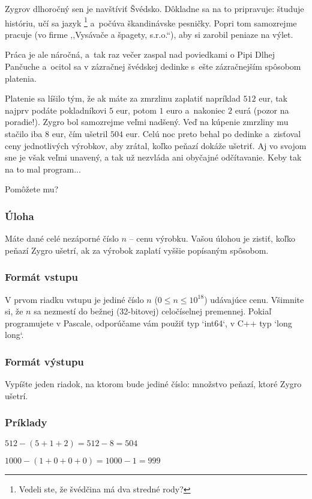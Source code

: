 Zygrov dlhoročný sen je navštíviť Švédsko. Dôkladne sa na to pripravuje: študuje históriu, učí sa jazyk%
\footnote{Vedeli ste, že švédčina má dva stredné rody?} a~počúva škandinávske pesničky.
Popri tom samozrejme pracuje (vo firme ,,Vysávače a špagety, s.r.o.``), aby si zarobil peniaze na výlet. 

Práca je ale náročná, a~tak raz večer zaspal nad poviedkami o Pipi Dlhej Pančuche
a~ocitol sa v zázračnej švédskej dedinke s~ešte zázračnejším spôsobom platenia.

Platenie sa líšilo tým, že ak máte za zmrzlinu zaplatiť napríklad $512$ eur, tak najprv podáte pokladníkovi $5$ eur,
potom $1$ euro a~nakoniec $2$ eurá (pozor na poradie!).
Zygro bol samozrejme veľmi nadšený. Veď na kúpenie zmrzliny mu stačilo iba $8$ eur, čím ušetril
$504$ eur. Celú noc preto behal po dedinke a~zisťoval ceny jednotlivých výrobkov, aby zrátal, koľko
peňazí dokáže ušetriť. Aj vo svojom sne je však veľmi unavený, a tak už nezvláda ani obyčajné
odčítavanie. Keby tak na to mal program...

Pomôžete mu?

\subsubsection{Úloha}

Máte dané celé nezáporné číslo $n$ -- cenu výrobku. Vašou úlohou je zistiť, koľko
peňazí Zygro ušetrí, ak za výrobok zaplatí vyššie popísaným spôsobom.

\subsubsection{Formát vstupu}

V prvom riadku vstupu je jediné číslo $n$ ($0 \leq n \leq 10^{18}$) udávajúce cenu. 
Všimnite si, že $n$ sa nezmestí do bežnej (32-bitovej) celočíselnej premennej.
Pokiaľ programujete v Pascale, odporúčame vám použiť typ `int64`, v C++ typ `long
long`.

\subsubsection{Formát výstupu}

Vypíšte jeden riadok, na ktorom bude jediné číslo: množstvo peňazí, ktoré Zygro
ušetrí.

\subsubsection{Príklady}


$512 - (5 + 1 + 2) = 512 - 8 = 504$


$1000 - (1 + 0 + 0 + 0) = 1000 - 1 = 999$
